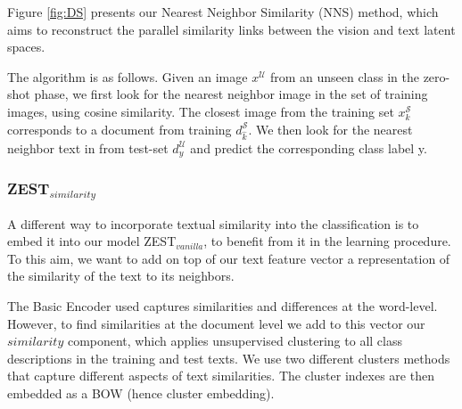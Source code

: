 \documentclass[11pt,a4paper]{article}
\newcommand\yuval[1]{\textcolor{darkpink}{\textbf{YUVAL:} #1 }}
\newcommand\reut[1]{\textcolor{green}{\textbf{REUT:} #1 }}
\begin{document}
Figure \ref{fig:DS} presents our Nearest Neighbor Similarity (NNS) method, which aims to  reconstruct  the parallel similarity links between the  vision and text latent spaces. 


The algorithm is as follows. Given an image $x^{\mathcal{U}}$ from an unseen class in the zero-shot phase,
we first look for the nearest neighbor image in the set of training images, using cosine similarity. The closest image from the training set $x^{\mathcal{S}}_k$ corresponds to a document from training $d^{\mathcal{S}}_{\hat{k}}$. We then look for the nearest neighbor text in from test-set $d^{\mathcal{U}}_y$ and predict the corresponding class label y.
 

\subsubsection{ZEST$_{similarity}$}
\label{section:similarity_component}

A different way to incorporate textual similarity into the classification is to embed it into our model ZEST$_{vanilla}$, to benefit from it in the learning procedure. To this aim, we want to add on top of our text feature vector a representation of the similarity of the text to its neighbors.  \par


The Basic Encoder used captures similarities and differences at the word-level. However, to find similarities at the document level we add to this vector our $similarity$ component, %
which applies unsupervised clustering to all class descriptions in the training and test texts. We use two different clusters methods that capture different aspects of text similarities. The cluster indexes are then embedded as a BOW (hence cluster embedding). \par
\end{document}
